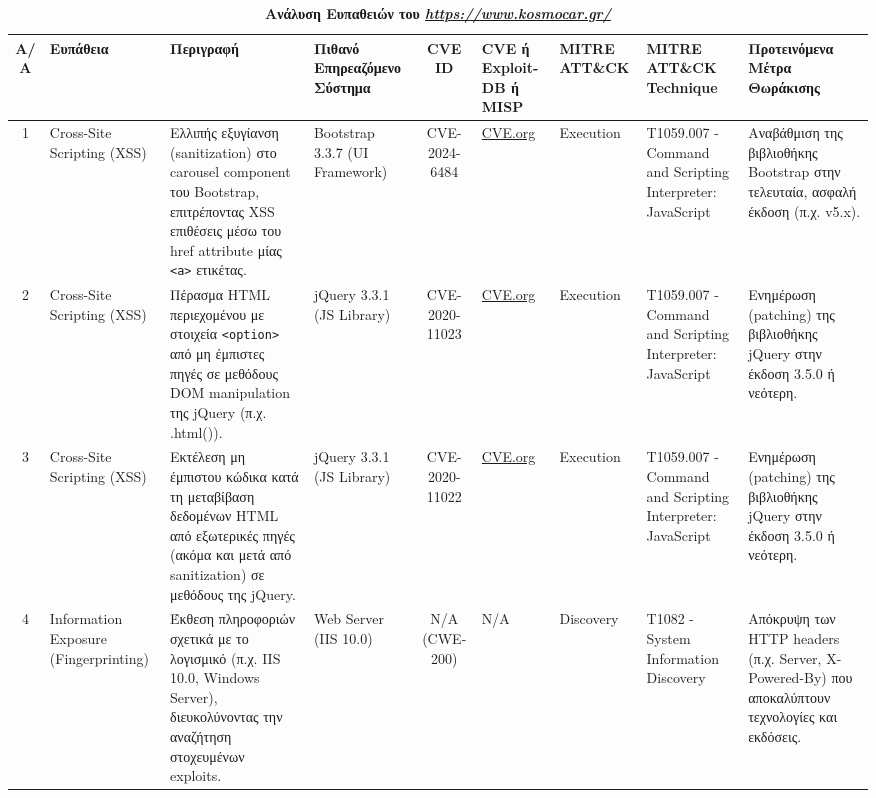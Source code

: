\documentclass[12pt, a4paper]{article}
\begin{document}
\begin{landscape}
\begin{table}[ht]
\caption{\textbf{Ανάλυση Ευπαθειών του \textit{\href{https://www.kosmocar.gr/}{https://www.kosmocar.gr/}}}}
\label{tab:4}
\centering
\small
\renewcommand{\arraystretch}{1.5}
\begin{tabularx}{\linewidth}{|c|p{2.2cm}|X|p{2cm}|c|p{2.2cm}|p{2cm}|p{3.5cm}|X|}
\hline
\rowcolor{tablehead}
\textbf{Α/Α} & \textbf{Ευπάθεια} & \textbf{Περιγραφή} & \textbf{Πιθανό Επηρεαζόμενο Σύστημα} & \textbf{CVE ID} & \textbf{CVE ή Exploit-DB ή MISP} & \textbf{MITRE ATT\&CK} & \textbf{MITRE ATT\&CK Technique} & \textbf{Προτεινόμενα Μέτρα Θωράκισης} \\
\hline
1 & Cross-Site Scripting (XSS) & Ελλιπής εξυγίανση (sanitization) στο carousel component του Bootstrap, επιτρέποντας XSS επιθέσεις μέσω του href attribute μίας \verb|<a>| ετικέτας. & Bootstrap 3.3.7 (UI Framework) & CVE-2024-6484 & \href{https://www.cve.org/CVERecord?id=CVE-2024-6484}{CVE.org} & Execution & T1059.007 - Command and Scripting Interpreter: JavaScript & Αναβάθμιση της βιβλιοθήκης Bootstrap στην τελευταία, ασφαλή έκδοση (π.χ. v5.x). \\
\hline
2 & Cross-Site Scripting (XSS) & Πέρασμα HTML περιεχομένου με στοιχεία \verb|<option>| από μη έμπιστες πηγές σε μεθόδους DOM manipulation της jQuery (π.χ. .html()). & jQuery 3.3.1 (JS Library) & CVE-2020-11023 & \href{https://www.cve.org/CVERecord?id=CVE-2020-11023}{CVE.org} & Execution & T1059.007 - Command and Scripting Interpreter: JavaScript & Ενημέρωση (patching) της βιβλιοθήκης jQuery στην έκδοση 3.5.0 ή νεότερη. \\
\hline
3 & Cross-Site Scripting (XSS) & Εκτέλεση μη έμπιστου κώδικα κατά τη μεταβίβαση δεδομένων HTML από εξωτερικές πηγές (ακόμα και μετά από sanitization) σε μεθόδους της jQuery. & jQuery 3.3.1 (JS Library) & CVE-2020-11022 & \href{https://www.cve.org/CVERecord?id=CVE-2020-11022}{CVE.org} & Execution & T1059.007 - Command and Scripting Interpreter: JavaScript & Ενημέρωση (patching) της βιβλιοθήκης jQuery στην έκδοση 3.5.0 ή νεότερη. \\
\hline
4 & Information Exposure (Fingerprinting) & Έκθεση πληροφοριών σχετικά με το λογισμικό (π.χ. IIS 10.0, Windows Server), διευκολύνοντας την αναζήτηση στοχευμένων exploits. & Web Server (IIS 10.0) & N/A (CWE-200) & N/A & Discovery & T1082 - System Information Discovery & Απόκρυψη των HTTP headers (π.χ. Server, X-Powered-By) που αποκαλύπτουν τεχνολογίες και εκδόσεις. \\
\hline
\end{tabularx}
\end{table}

\end{landscape}
\end{document}
